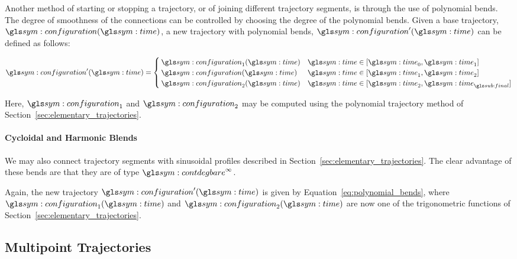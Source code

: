 				Another method of starting or stopping a trajectory, or of
				joining different trajectory segments, is through the use of
				polynomial bends. The degree of smoothness of the connections
				can be controlled by choosing the degree of the polynomial
				bends. Given a base trajectory, $\configuration(\timesym)$, a
				new trajectory with polynomial bends,
				$\configuration'(\timesym)$ can be defined as follows:

				\begin{equation}
					\configuration'(\timesym) =
					\begin{cases}
						\configuration_1(\timesym) & \timesym \in [\timesym_0, \timesym_1] \\
						\configuration(\timesym) & \timesym \in [\timesym_1, \timesym_2] \\
						\configuration_2(\timesym) & \timesym \in [\timesym_2, \timesym_{\final}] \\
					\end{cases}
					\label{eq:polynomial_bends}
				\end{equation}

				Here, $\configuration_1$ and $\configuration_2$ may be computed
				using the polynomial trajectory method of
				Section~\ref{sec:elementary_trajectories}.


			\paragraph{Cycloidal and Harmonic Blends}%
			\label{cycloidal_and_harmonic_blends}

				We may also connect trajectory segments with sinusoidal
				profiles described in Section~\ref{sec:elementary_trajectories}.
				The clear advantage of these bends are that they are of type
				$\contdeg{\infty}$.

				Again, the new trajectory $\configuration'(\timesym)$ is given
				by Equation~\ref{eq:polynomial_bends}, where
				$\configuration_1(\timesym)$ and $\configuration_2(\timesym)$
				are now one of the trigonometric functions of
				Section~\ref{sec:elementary_trajectories}.

	\subsection{Multipoint Trajectories}%
	\label{sec:multipoint_trajectories}

